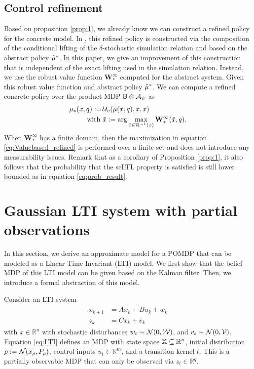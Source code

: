 \documentclass{ifacconf}
\begin{document}
\subsection{Control refinement}\label{sec:control}
Based on proposition \ref{prop:1}, we already know we can construct a refined policy for the concrete model. In \cite{tech_report_TACAS}, this refined policy is constructed via the composition of the conditional lifting of the $\delta$-stochastic simulation relation and based on the abstract policy $\tilde  {{\mu}}^\ast$. 
In this paper, we give an improvement of this construction that is independent of the exact lifting used in the simulation relation. Instead, we use the robust  value function $\mathbf  W^\infty_\ast$ computed for the abstract system.
Given this robust value function  
	and abstract policy  $\tilde  {{\mu}}^\ast$. We can compute a refined  concrete policy over the product MDP $\mathsf{B}\otimes\mathcal{A}_\psi$ as
	\begin{align}\label{eq:Valuebased_refined}
		{\mu}_\ast(x,q):=\, &\mathcal{U}_{v}( \tilde{{\mu}}(\tilde x, q), \tilde x, x) \\ \mbox{ with } &\tilde x:=\arg\max_{ \tilde x\in
		\mathcal{R}^{-1}(x)} \mathbf  W^\infty_\ast(\tilde x,q).\notag
	\end{align}
When  $\mathbf  W^\infty_\ast$ has a finite domain, then  the maximization in equation \eqref{eq:Valuebased_refined} is performed over a finite set and does not introduce any measurability issues. 
Remark that as a corollary of Proposition \ref{prop:1}, it also follows that the probability that the scLTL property is satisfied is still lower bounded as in equation \eqref{eq:prob_result}.
 
\section{Gaussian LTI system with partial observations}\label{sec:case}
In this section, we derive an approximate model for a POMDP that can be modeled as a Linear Time Invariant (LTI) model.  We first show that the belief MDP of this LTI model can be given based on the Kalman filter. Then, we introduce a formal abstraction of this model.

Consider an LTI system
 \begin{align} \label{eq:LTI} \begin{aligned}
x_{k+1}&=A x_{k} + B u_k+ w_k\\
z_k&=Cx_k+v_k\end{aligned} \end{align}
with $x\in \mathbb{R}^n$ with stochastic disturbances $w_t\sim \mathcal N(0,\mathcal{W})$, and $v_t\sim \mathcal N(0,\mathcal{V})$. 
Equation  \eqref{eq:LTI}  defines an MDP with state space ${\mathbb{X}}\subseteq\mathbb R^n$,  initial distribution  $\rho:=\mathcal N(x_\rho,P_\rho)$,  control inputs $u_t\in\mathbb R^m$, and a transition kernel $t$. %
This is a partially observable MDP that can only be observed via  $z_t\in\mathbb R^q$.
 
\end{document}
